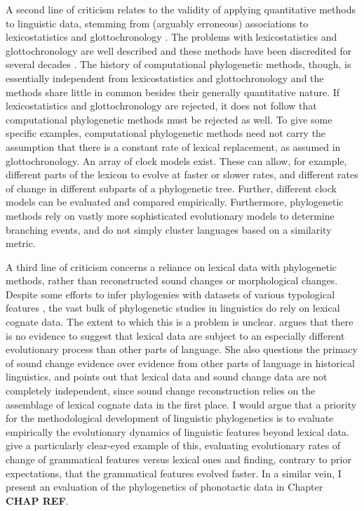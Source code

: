 A second line of criticism relates to the validity of applying quantitative methods to linguistic data, stemming from (arguably erroneous) associations to lexicostatistics and glottochronology \autocites{eska_recent_2004}{holm_new_2007}. The problems with lexicostatistics and glottochronology are well described and these methods have been discredited for several decades \autocite[see][pp.~285--286]{bowern_computational_2018}. The history of computational phylogenetic methods, though, is essentially independent from lexicostatistics and glottochronology and the methods share little in common besides their generally quantitative nature. If lexicostatistics and glottochronology are rejected, it does not follow that computational phylogenetic methods must be rejected as well. To give some specific examples, computational phylogenetic methods need not carry the assumption that there is a constant rate of lexical replacement, as assumed in glottochronology. An array of clock models exist. These can allow, for example, different parts of the lexicon to evolve at faster or slower rates, and different rates of change in different subparts of a phylogenetic tree. Further, different clock models can be evaluated and compared empirically. Furthermore, phylogenetic methods rely on vastly more sophisticated evolutionary models to determine branching events, and do not simply cluster languages based on a similarity metric.

A third line of criticism concerns a reliance on lexical data with phylogenetic methods, rather than reconstructed sound changes or morphological changes. Despite some efforts to infer phylogenies with datasets of various typological features \autocite[e.g.][]{dunn_structural_2005}, the vast bulk of phylogenetic studies in linguistics do rely on lexical cognate data. The extent to which this is a problem is unclear. \textcite{bowern_computational_2018} argues that there is no evidence to suggest that lexical data are subject to an especially different evolutionary process than other parts of language. She also questions the primacy of sound change evidence over evidence from other parts of language in historical linguistics, and points out that lexical data and sound change data are not completely independent, since sound change reconstruction relies on the assemblage of lexical cognate data in the first place. I would argue that a priority for the methodological development of linguistic phylogenetics is to evaluate empirically the evolutionary dynamics of linguistic features beyond lexical data. \textcite{greenhill_evolutionary_2017} give a particularly clear-eyed example of this, evaluating evolutionary rates of change of grammatical features versus lexical ones and finding, contrary to prior expectations, that the grammatical features evolved faster. In a similar vein, I present an evaluation of the phylogenetics of phonotactic data in Chapter \textbf{CHAP REF}.

